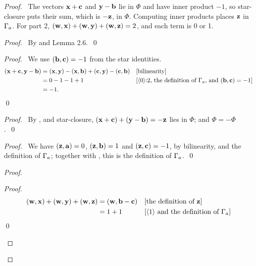 \begin{proof}
  \pfsketch\ The vectors ${\mathbf x}+{\mathbf c}$ and ${\mathbf y}-{\mathbf b}$ lie in $\Phi$ and have inner product $-1$, so
  star-closure puts their sum, which is $-{\mathbf z}$, in $\Phi$. Computing inner products places ${\mathbf z}$
  in $\Gamma_a$. For part 2, $({\mathbf w},{\mathbf x})+({\mathbf w},{\mathbf y})+({\mathbf w},{\mathbf z})=2$, and each term is 0 or 1.

  \begin{proof}
    \pf\ By  and Lemma 2.6.~\qed
  \end{proof}

  \begin{proof}
    \pf\ We use $({\mathbf b},{\mathbf c})=-1$ from the star identities.
    \begin{align*}
      (\Zx+\Zc,\Zy-\Zb)&=(\Zx,\Zy)-(\Zx,\Zb)+(\Zc,\Zy)-(\Zc,\Zb)
        &&\text{[bilinearity]}\\
      &=0-1-1+1
        &&\text{[\asm[2]{0}, the definition of $\Ga$, and $(\Zb,\Zc)=-1$]}\\
      &=-1.
    \end{align*}
    \qed
  \end{proof}

  \begin{proof}
    \pf\ By ,  and star-closure, $({\mathbf x}+{\mathbf c})+({\mathbf y}-{\mathbf b})=-{\mathbf z}$ lies in
    $\Phi$; and $\Phi=-\Phi$.~\qed
  \end{proof}

  \begin{proof}
    \pf\ We have $({\mathbf z},{\mathbf a})=0$, $({\mathbf z},{\mathbf b})=1$ and $({\mathbf z},{\mathbf c})=-1$, by bilinearity,  and
    the definition of $\Gamma_a$; together with , this is the definition of
    $\Gamma_a$.~\qed
  \end{proof}

  \begin{proof}
    \begin{proof}
      \pf\
      \begin{align*}
        (\Zw,\Zx)+(\Zw,\Zy)+(\Zw,\Zz)&=(\Zw,\Zb-\Zc)&&\text{[the definition of $\Zz$]}\\
        &=1+1&&\text{[\asm{1} and the definition of $\Ga$]}
      \end{align*}
      \qed
    \end{proof}


\end{proof}
\end{proof}
